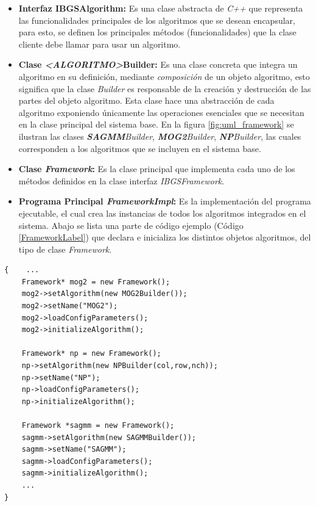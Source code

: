 \begin{itemize}
\item \textbf{Interfaz IBGSAlgorithm:} Es una clase abstracta de \textit{C++} que representa las funcionalidades principales de los algoritmos que se desean encapsular, para esto, se definen los principales métodos (funcionalidades) que la clase cliente debe llamar para usar un algoritmo.
\item \textbf{Clase \textit{<ALGORITMO>}Builder:} Es una clase concreta que integra un algoritmo en su definición, mediante \textit{composición} de un objeto algoritmo, esto significa que la clase \textit{Builder} es responsable de la creación y destrucción de las partes del objeto algoritmo. Esta clase hace una abstracción de cada algoritmo exponiendo únicamente las operaciones esenciales que se necesitan en la clase principal del sistema base. En la figura \ref{fig:uml_framework} se ilustran las clases \textit{\textbf{SAGMM}Builder}, \textit{\textbf{MOG2}Builder}, \textit{\textbf{NP}Builder}, las cuales corresponden a los algoritmos que se incluyen en el sistema base.
\item \textbf{Clase \textit{Framework}:} Es la clase principal que implementa cada uno de los métodos definidos en la clase interfaz \textit{IBGSFramework}.
\item \textbf{Programa Principal \textit{FrameworkImpl}:} Es la implementación del programa ejecutable, el cual crea las instancias de todos los algoritmos integrados en el sistema. Abajo se lista una parte de código ejemplo (Código \ref{FrameworkLabel}) que declara e inicializa los distintos objetos algoritmos, del tipo de clase \textit{Framework}.
\end{itemize}




\begin{lstlisting}[caption={Ejemplo de instanciación distintos objetos de algoritmos en programa principal. Cada algoritmo en este ejemplo, se declara como un tipo de la clase \textit{Framework} y luego se utilizan los métodos que configuran ese algoritmo.},label=FrameworkLabel]
{    ...
    Framework* mog2 = new Framework();
    mog2->setAlgorithm(new MOG2Builder());
    mog2->setName("MOG2");
    mog2->loadConfigParameters();
    mog2->initializeAlgorithm();

    Framework* np = new Framework();
    np->setAlgorithm(new NPBuilder(col,row,nch));
    np->setName("NP");
    np->loadConfigParameters();
    np->initializeAlgorithm();

    Framework *sagmm = new Framework();
    sagmm->setAlgorithm(new SAGMMBuilder());
    sagmm->setName("SAGMM");
    sagmm->loadConfigParameters();
    sagmm->initializeAlgorithm();
    ...
}
\end{lstlisting}

